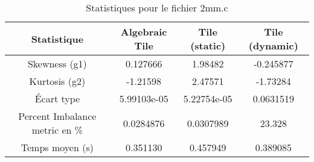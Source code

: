 \documentclass{article}
\begin{document}
\begin{table}[htbp]
  \centering
  \caption{Statistiques pour le fichier 2mm.c}
  \begin{tabular}{|c|c|c|c|}
    \hline
    Statistique & Algebraic Tile & Tile (static) & Tile (dynamic) \\ 
    \hline
    Skewness (g1) & 0.127666 & 1.98482 & -0.245877 \\ 
    Kurtosis (g2) & -1.21598 & 2.47571 & -1.73284 \\ 
    Écart type & 5.99103e-05 & 5.22754e-05 & 0.0631519\\ 
    Percent Imbalance metric en \% & 0.0284876 & 0.0307989 & 23.328\\ 
    Temps moyen (s) & 0.351130 & 0.457949 & 0.389085 \\ 
    \hline
  \end{tabular}
\end{table}
\newpage
\end{document}
